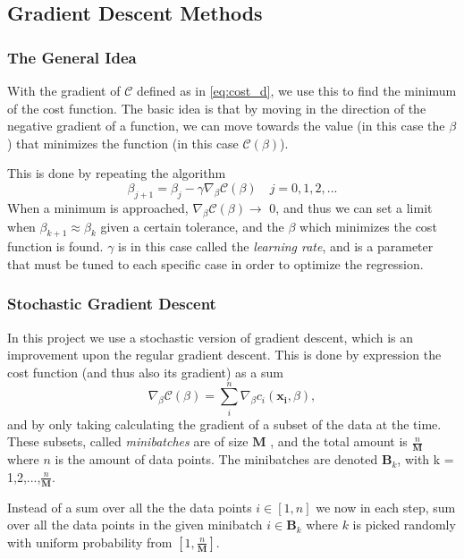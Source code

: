 \subsection{Gradient Descent Methods}
\subsubsection*{The General Idea}
With the gradient of $\mathcal{C}$ defined as in \eqref{eq:cost_d}, we use this to find the minimum of the cost function. The basic idea is that by moving in the direction of the negative gradient of a function, we can move towards the value (in this case the $\beta$) that minimizes the function (in this case $\mathcal{C}(\beta)$). \cite{GDLectures}

This is done by repeating the algorithm
\begin{equation}
    \beta_{j+1} = \beta_j - \gamma \nabla_\beta \mathcal{C}(\beta) \quad j = 0,1,2,...
    \label{eq:gradient_decent}
\end{equation}
When a minimum is approached, $\nabla_\beta \mathcal{C}(\beta) \rightarrow$ 0, and thus we can set a limit when $\beta_{k+1} \approx \beta_k$ given a certain tolerance, and the $\beta$ which minimizes the cost function is found. $\gamma$ is in this case called the \textit{learning rate}, and is a parameter that must be tuned to each specific case in order to optimize the regression.

\subsubsection*{Stochastic Gradient Descent}
In this project we use a stochastic version of gradient descent, which is an improvement upon the regular gradient descent. This is done by expression the cost function (and thus also its gradient) as a sum
\begin{equation}
    \nabla_\beta \mathcal{C}(\beta) = \sum_i^n     \nabla_\beta c_i(\boldsymbol{x_i},\beta) ,
    \label{eq:gradient_sum}
\end{equation}
and by only taking calculating the gradient of a subset of the data at the time. These subsets, called \textit{minibatches} are of size $\boldsymbol{M}$ , and the total amount is $\frac{n}{\boldsymbol{M}}$ where $n$ is the amount of data points. The minibatches are denoted $\boldsymbol{B}_k$, with k = 1,2,...,$\frac{n}{\boldsymbol{M}}$.

Instead of a sum over all the the data points $i \in [1,n]$ we now in each step, sum over all the data points in the given minibatch $i \in \boldsymbol{B}_k$ where $k$ is picked randomly with uniform probability from $[1, \frac{n}{\boldsymbol{M}}]$.

